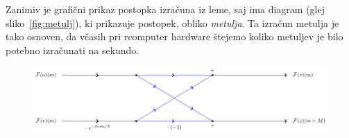 Zanimiv je grafični prikaz postopka izračuna iz leme, saj ima diagram (glej sliko~\ref{fig:metulj}), ki prikazuje postopek, obliko \emph{metulja}. Ta izračun metulja je tako osnoven, da včasih pri rcomputer hardware štejemo koliko metuljev je bilo potebno izračunati na sekundo.

%
\begin{figure}[htbp]
  \centering
  \includegraphics[width=1\textwidth]{./slike-latex/metulj}
\end{figure}
%

